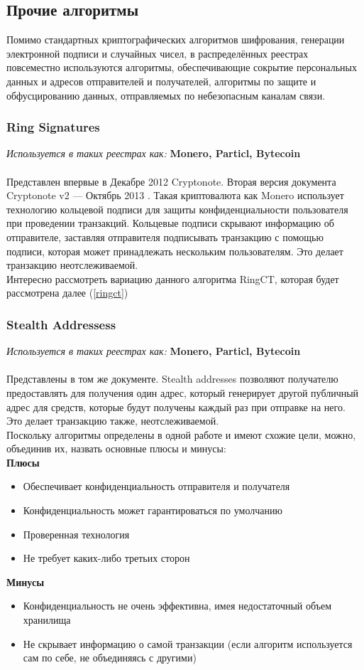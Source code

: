 \newpage
\subsection{Прочие алгоритмы}
Помимо стандартных криптографических алгоритмов шифрования, генерации
электронной подписи и случайных чисел, в распределённых реестрах повсеместно
используются алгоритмы, обеспечивающие сокрытие персональных данных и адресов
отправителей и получателей, алгоритмы по защите и обфусцированию данных,
отправляемых по небезопасным каналам связи.
\subsubsection{Ring Signatures}
\emph{Используется в таких реестрах как: } \textbf{Monero, Particl, Bytecoin} \\\\
Представлен впервые в Декабре 2012 \cite{VanSaberhagen2012} Cryptonote. Вторая версия документа
Cryptonote v2 --- Октябрь 2013 \cite{VanSaberhagen2013}.
Такая криптовалюта как Monero использует технологию кольцевой
подписи для защиты конфиденциальности пользователя при проведении транзакций.
Кольцевые подписи скрывают информацию об отправителе, заставляя отправителя
подписывать транзакцию с помощью подписи, которая может принадлежать нескольким
пользователям. Это делает транзакцию неотслеживаемой.\\
Интересно рассмотреть вариацию данного алгоритма RingCT, которая будет
рассмотрена далее (\ref{ringct})
\subsubsection{Stealth Addressess}
\emph{Используется в таких реестрах как: } \textbf{Monero, Particl, Bytecoin} \\\\
Представлены в том же документе. Stealth addresses позволяют получателю
предоставлять для получения один адрес, который генерирует другой публичный
адрес для средств, которые будут получены каждый раз при отправке на него. Это
делает транзакцию также, неотслеживаемой.\\

Поскольку алгоритмы определены в одной работе и имеют схожие цели, можно,
объединив их, назвать основные плюсы и минусы:\\
\textbf{Плюсы}
\begin{itemize}
    \item Обеспечивает конфиденциальность отправителя и получателя
    \item Конфиденциальность может гарантироваться по умолчанию
    \item Проверенная технология
    \item Не требует каких-либо третьих сторон
\end{itemize}
\textbf{Минусы}
\begin{itemize}
    \item Конфиденциальность не очень эффективна, имея недостаточный объем
          хранилища
    \item Не скрывает информацию о самой транзакции (если алгоритм
          используется сам по себе, не объединяясь с другими)
\end{itemize}


